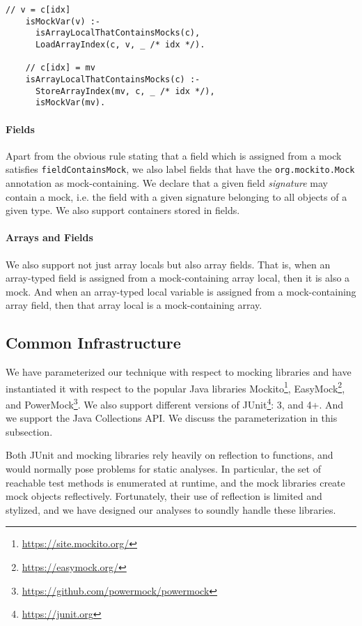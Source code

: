 \begin{lstlisting}[basicstyle=\ttfamily\small,numbers=none]
    // v = c[idx]
    isMockVar(v) :-
      isArrayLocalThatContainsMocks(c),
      LoadArrayIndex(c, v, _ /* idx */).

    // c[idx] = mv
    isArrayLocalThatContainsMocks(c) :-
      StoreArrayIndex(mv, c, _ /* idx */),
      isMockVar(mv).
\end{lstlisting}

\paragraph{Fields} Apart from the obvious rule stating that a field which is assigned from a mock satisfies {\tt fieldContainsMock}, we also label fields that have the {\tt org.mockito.Mock} annotation as mock-containing. We declare that a given field \emph{signature} may contain a mock, i.e. the field with a given signature belonging to all objects of a given type. We also support containers stored in fields.

\paragraph{Arrays and Fields} We also support not just array locals but also array fields. That is, when an array-typed field is assigned from a mock-containing array local, then it is also a mock. And when an array-typed local variable is assigned from a mock-containing array field, then that array local is a mock-containing array.

\subsection{Common Infrastructure}
\label{sec:common}
We have parameterized our technique with respect to mocking libraries and have instantiated it with respect to the popular Java libraries Mockito\footnote{\url{https://site.mockito.org/}}, EasyMock\footnote{\url{https://easymock.org/}}, and PowerMock\footnote{\url{https://github.com/powermock/powermock}}. We also support different versions of JUnit\footnote{\url{https://junit.org}}: 3, and 4+. And we support the Java Collections API. We discuss the parameterization in this subsection.

Both JUnit and mocking libraries rely heavily on reflection to functions, and would normally pose problems for static analyses. In particular, the set of reachable test methods is enumerated at runtime, and the mock libraries create mock objects reflectively. Fortunately, their use of reflection is limited and stylized, and we have designed our analyses to soundly handle these libraries.

